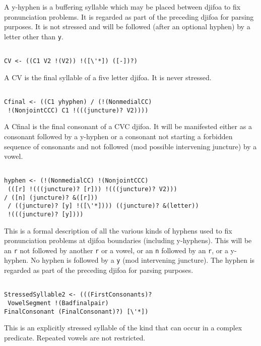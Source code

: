 \documentclass[12pt]{article}
\begin{document}
A y-hyphen is a buffering syllable which may be placed between djifoa to fix pronunciation problems.  It is regarded
as part of the preceding djifoa for parsing purposes.  It is not stressed and will be followed (after an optional hyphen)
by a letter other than {\tt y}.

\begin{verbatim}

CV <- ((C1 V2 !(V2)) !([\'*]) ([-])?)

\end{verbatim}

A CV is the final syllable of a five letter djifoa.  It is never stressed.

\begin{verbatim}

Cfinal <- ((C1 yhyphen) / (!(NonmedialCC)
 !(NonjointCCC) C1 !(((juncture)? V2))))

\end{verbatim}

A Cfinal is the final consonant of a CVC djifoa.  It will be manifested either as a consonant followed by
a y-hyphen or a consonant not starting a forbidden sequence of consonants and not followed (mod possible intervening juncture) by a vowel.

\begin{verbatim}

hyphen <- (!(NonmedialCC) !(NonjointCCC)
 (([r] !(((juncture)? [r])) !(((juncture)? V2))) 
/ ([n] (juncture)? &([r]))
 / ((juncture)? [y] !([\'*]))) ((juncture)? &(letter))
 !(((juncture)? [y])))

\end{verbatim}

This is a formal description of all the various kinds of hyphens used to fix pronunciation problems at djifoa boundaries
(including y-hyphens).  This will be an {\tt r} not followed by another {\tt r} or a vowel, or an {\tt n} followed by
an {\tt r}, or a y-hyphen.  No hyphen is followed by a {\tt y} (mod intervening juncture).  The hyphen is regarded
as  part of the preceding djifoa for parsing purposes.

\begin{verbatim}

StressedSyllable2 <- (((FirstConsonants)?
 VowelSegment !(Badfinalpair) 
FinalConsonant (FinalConsonant)?) [\'*])

\end{verbatim}

This is an explicitly stressed syllable of the kind that can occur in a complex predicate.  Repeated vowels are not restricted.
\end{document}
